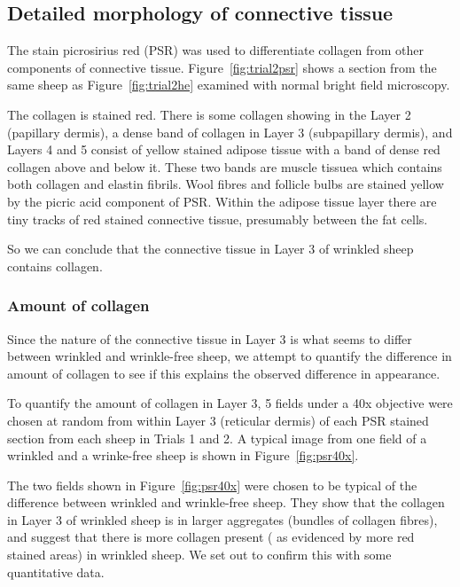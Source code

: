 \documentclass[titlepage]{article}  %
\begin{document}
\subsection{Detailed morphology of connective tissue} 
The stain picrosirius red (PSR) was used to differentiate collagen from other components of connective tissue. Figure~\ref{fig:trial2psr} shows a section from the same sheep as Figure~\ref{fig:trial2he} examined with normal bright field microscopy. 

The collagen is stained red. There is some collagen showing in the Layer 2 (papillary dermis), a dense band of collagen in Layer 3 (subpapillary dermis), and Layers 4 and 5 consist of yellow stained adipose tissue with a band of dense red collagen above and below it. These two bands are muscle tissuea which contains both collagen and elastin fibrils.  Wool fibres and follicle bulbs are stained yellow by the picric acid component of PSR. Within the  adipose tissue layer there are tiny tracks of red stained connective tissue, presumably between the fat cells.

So we can conclude that the  connective tissue in Layer 3 of wrinkled sheep contains collagen. 

\subsubsection{Amount of collagen}
Since the nature of the connective tissue in Layer 3 is what seems to differ between wrinkled and wrinkle-free sheep, we attempt to quantify the difference in amount of collagen to see if this explains the observed difference in appearance.

To quantify the amount of collagen in Layer 3, 5 fields under a 40x objective were chosen at random from within Layer 3 (reticular dermis) of each PSR stained section from each sheep in Trials 1 and 2. A typical image from one field of a wrinkled and a wrinke-free sheep is shown in Figure~\ref{fig:psr40x}.

The two fields shown in Figure~\ref{fig:psr40x} were chosen to be typical of the difference between wrinkled and wrinkle-free sheep. They show that the collagen in Layer 3 of wrinkled sheep is in larger aggregates (bundles of collagen fibres), and suggest that there is more collagen present ( as evidenced by more red stained areas) in wrinkled sheep. We set out to confirm this with some quantitative data.
\end{document}
